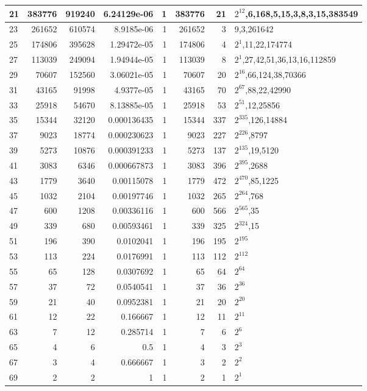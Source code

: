 \documentclass[10pt,a4paper]{standalone}
\begin{document}
\begin{tabular}{l|r|r|r|r|r|r|l|}
21 & 383776 & 919240 & 6.24129e-06 & 1 & 383776 & 21 & $2^{12}$,6,168,5,15,3,8,3,15,383549 \\ \hline
23 & 261652 & 610574 & 8.9185e-06 & 1 & 261652 & 3 & 9,3,261642 \\ \hline
25 & 174806 & 395628 & 1.29472e-05 & 1 & 174806 & 4 & $2^{1}$,11,22,174774 \\ \hline
27 & 113039 & 249094 & 1.94944e-05 & 1 & 113039 & 8 & $2^{1}$,27,42,51,36,13,16,112859 \\ \hline
29 & 70607 & 152560 & 3.06021e-05 & 1 & 70607 & 20 & $2^{16}$,66,124,38,70366 \\ \hline
31 & 43165 & 91998 & 4.9377e-05 & 1 & 43165 & 70 & $2^{67}$,88,22,42990 \\ \hline
33 & 25918 & 54670 & 8.13885e-05 & 1 & 25918 & 53 & $2^{51}$,12,25856 \\ \hline
35 & 15344 & 32120 & 0.000136435 & 1 & 15344 & 337 & $2^{335}$,126,14884 \\ \hline
37 & 9023 & 18774 & 0.000230623 & 1 & 9023 & 227 & $2^{226}$,8797 \\ \hline
39 & 5273 & 10876 & 0.000391233 & 1 & 5273 & 137 & $2^{135}$,19,5120 \\ \hline
41 & 3083 & 6346 & 0.000667873 & 1 & 3083 & 396 & $2^{395}$,2688 \\ \hline
43 & 1779 & 3640 & 0.00115078 & 1 & 1779 & 472 & $2^{470}$,85,1225 \\ \hline
45 & 1032 & 2104 & 0.00197746 & 1 & 1032 & 265 & $2^{264}$,768 \\ \hline
47 & 600 & 1208 & 0.00336116 & 1 & 600 & 566 & $2^{565}$,35 \\ \hline
49 & 339 & 680 & 0.00593461 & 1 & 339 & 325 & $2^{324}$,15 \\ \hline
51 & 196 & 390 & 0.0102041 & 1 & 196 & 195 & $2^{195}$ \\ \hline
53 & 113 & 224 & 0.0176991 & 1 & 113 & 112 & $2^{112}$ \\ \hline
55 & 65 & 128 & 0.0307692 & 1 & 65 & 64 & $2^{64}$ \\ \hline
57 & 37 & 72 & 0.0540541 & 1 & 37 & 36 & $2^{36}$ \\ \hline
59 & 21 & 40 & 0.0952381 & 1 & 21 & 20 & $2^{20}$ \\ \hline
61 & 12 & 22 & 0.166667 & 1 & 12 & 11 & $2^{11}$ \\ \hline
63 & 7 & 12 & 0.285714 & 1 & 7 & 6 & $2^{6}$ \\ \hline
65 & 4 & 6 & 0.5 & 1 & 4 & 3 & $2^{3}$ \\ \hline
67 & 3 & 4 & 0.666667 & 1 & 3 & 2 & $2^{2}$ \\ \hline
69 & 2 & 2 & 1 & 1 & 2 & 1 & $2^{1}$ \\ \hline
\end{tabular}
\end{document}
